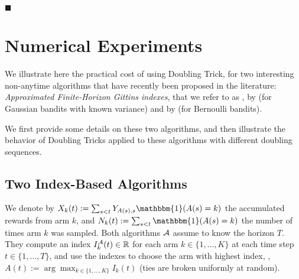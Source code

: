 \documentclass[12pt]{colt2018} %
\begin{document}
\vspace*{-10pt}  %
\hfill{}
$\blacksquare$


\section{Numerical Experiments}\label{sec:experiments}

We illustrate here the practical cost of using Doubling Trick, for two interesting non-anytime algorithms that have recently been proposed in the literature:
\emph{Approximated Finite-Horizon Gittins indexes}, that we refer to as \AFHG, by \cite{Lattimore16a} (for Gaussian bandits with known variance)
and \KLUCBpp{} by \cite{Menard17} (for Bernoulli bandits).

We first provide some details on these two algorithms, and then illustrate the behavior of Doubling Tricks applied to these algorithms with different doubling sequences.


\subsection{Two Index-Based Algorithms}\label{sub:twoIndexBasedAlgorithms}

%
We denote by
$X_k(t) := \sum_{s < t} Y_{A(s), s} \mathbbm{1}(A(s) = k)$ the accumulated rewards from arm $k$,
and $N_k(t) := \sum_{s < t} \mathbbm{1}(A(s) = k)$ the number of times arm $k$ was sampled.
%
Both algorithms $\mathcal{A}$ assume to know the horizon $T$.
They compute an index $I_k^{\mathcal{A}}(t)\in\mathbb{R}$ for each arm $k\in\{1,\dots,K\}$ at each time step $t\in\{1,\dots,T\}$,
and use the indexes to choose the arm with highest index, \ie, $A(t) := \arg\max_{k\in\{1,\dots,K\}} I_k(t)$ (ties are broken uniformly at random).
\end{document}
